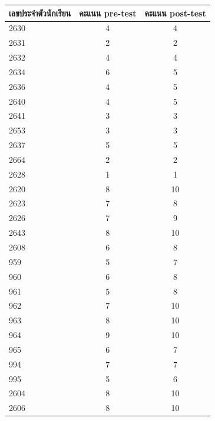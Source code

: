 \begin{table}[h]
    \begin{center}
        \begin{tabular}{ |l|c|c| }
            \hline
            เลขประจำตัวนักเรียน & คะแนน pre-test & คะแนน post-test\\
            \hline\hline
            2630 & 4 & 4\\
            \hline
            2631 & 2 & 2\\
            \hline
            2632 & 4 & 4\\
            \hline
            2634 & 6 & 5\\
            \hline
            2636 & 4 & 5\\
            \hline
            2640 & 4 & 5\\
            \hline
            2641 & 3 & 3\\
            \hline
            2653 & 3 & 3\\
            \hline
            2637 & 5 & 5\\
            \hline
            2664 & 2 & 2\\
            \hline
            2628 & 1 & 1\\
            \hline
            2620 & 8 & 10\\
            \hline
            2623 & 7 & 8\\
            \hline
            2626 & 7 & 9\\
            \hline
            2643 & 8 & 10\\
            \hline
            2608 & 6 & 8\\
            \hline
            959 & 5 & 7\\
            \hline
            960 & 6 & 8\\
            \hline
            961 & 5 & 8\\
            \hline
            962 & 7 & 10\\
            \hline
            963 & 8 & 10\\
            \hline
            964 & 9 & 10\\
            \hline
            965 & 6 & 7\\
            \hline
            994 & 7 & 7\\
            \hline
            995 & 5 & 6\\
            \hline
            2604 & 8 & 10\\
            \hline
            2606 & 8 & 10\\

\end{tabular}
\end{center}
\end{table}

